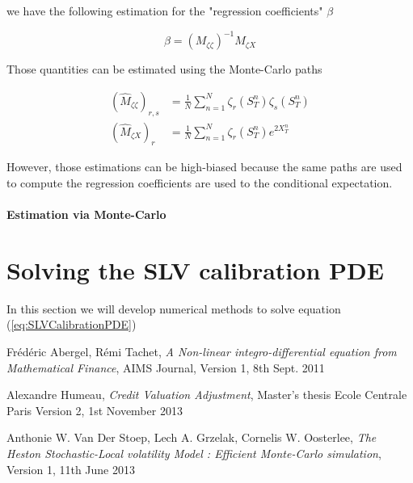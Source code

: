 \documentclass{article}
\begin{document}
\noindent we have the following estimation for the "regression coefficients" $\beta$

\begin{equation}	
	\beta = (M_{\zeta \zeta})^{-1} M_{\zeta X}
\end{equation}

\noindent Those quantities can be estimated using the Monte-Carlo paths

\begin{equation}
\begin{aligned}
	(\hat{M}_{\zeta \zeta})_{r,s} &= \frac{1}{N} \sum_{n=1}^N \zeta_r(S_T^n)\zeta_s(S_T^n)\\
	(\hat{M}_{\zeta X})_r &= \frac{1}{N} \sum_{n=1}^N \zeta_r(S_T^n)e^{2X_T^n}
\end{aligned}
\end{equation}

\noindent However, those estimations can be high-biased because the same paths are used to compute the regression coefficients are used to the conditional expectation.

\paragraph{Estimation via Monte-Carlo}

\section{Solving the SLV calibration PDE}
In this section we will develop numerical methods to solve equation (\ref{eq:SLVCalibrationPDE})

\begin{thebibliography}{9}

  Frédéric Abergel, Rémi Tachet,
  \emph{A Non-linear integro-differential equation from Mathematical Finance},
  AIMS Journal,
  Version 1, 8th Sept. 2011

 Alexandre Humeau,
 \emph{Credit Valuation Adjustment},
 Master's thesis Ecole Centrale Paris
 Version 2, 
 1st November 2013

 Anthonie W. Van Der Stoep, Lech A. Grzelak, Cornelis W. Oosterlee,
 \emph{The Heston Stochastic-Local volatility Model : Efficient Monte-Carlo simulation},
 Version 1, 11th June 2013

\end{thebibliography}
\end{document}
